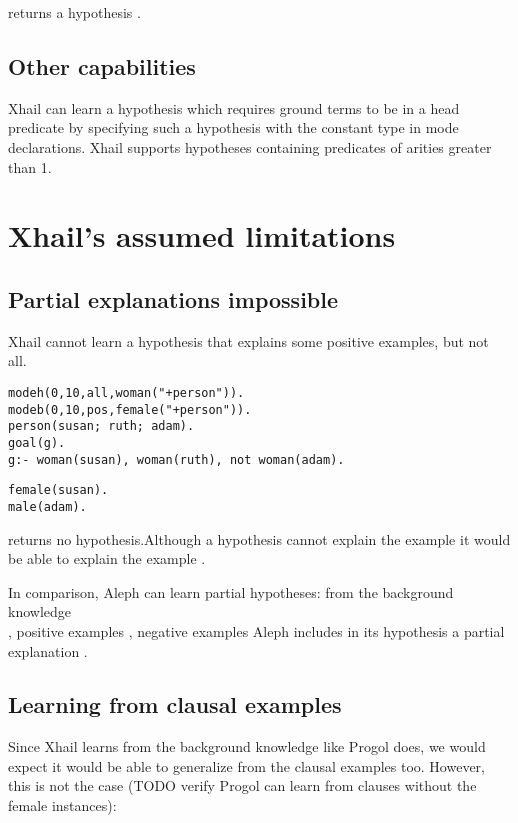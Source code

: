 returns a hypothesis
.
\subsection{Other capabilities}
Xhail can learn a hypothesis which requires ground terms to be in a head predicate by specifying such a hypothesis with the constant type  in mode declarations. Xhail supports hypotheses containing predicates of arities greater than 1.

\section{Xhail's assumed limitations}

\subsection{Partial explanations impossible}
Xhail cannot learn a hypothesis that explains some positive examples, but not all.

\begin{minipage}[t]{.60\textwidth}
\begin{lstlisting}
modeh(0,10,all,woman("+person")).
modeb(0,10,pos,female("+person")).
person(susan; ruth; adam).
goal(g).
g:- woman(susan), woman(ruth), not woman(adam).
\end{lstlisting}
\end{minipage}
\begin{minipage}[t]{.20\textwidth}
\begin{lstlisting}
female(susan).
male(adam).
\end{lstlisting}
\end{minipage}

returns no hypothesis.Although a hypothesis
 cannot explain the example  it would be able to explain the example .

In comparison, Aleph can learn partial hypotheses: from the background knowledge\\
, positive examples , negative examples  Aleph includes in its hypothesis a partial explanation
.

\subsection{Learning from clausal examples}
Since Xhail learns from the background knowledge like Progol does, we would expect it would be able to generalize from the clausal examples too. However, this is not the case (TODO verify Progol can learn from clauses without the female instances):

